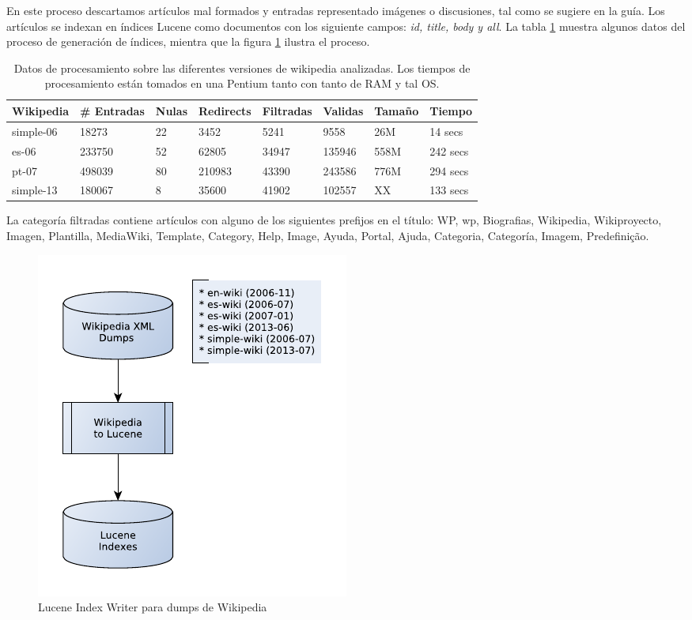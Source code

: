 En este proceso descartamos artículos mal formados y entradas representado imágenes o discusiones, tal como se sugiere en la guía. 
Los artículos se indexan en índices Lucene como documentos con los siguiente campos: \emph{id, title, body y all}. 
La tabla \ref{table:creacion-indices} muestra algunos datos del proceso de generación de índices, mientra que la figura \ref{fig:LuceneIndexWriterWiki} ilustra el proceso.

\begin{table}
\begin{center}
\begin{tabular}{| l | l | l | l | l | l| l|l|}
\hline
Wikipedia & \# Entradas & Nulas & Redirects & Filtradas & Validas & Tamaño & Tiempo \\ \hline
simple-06 & 18273 & 22 &  3452 & 5241 & 9558 & 26M & 14 secs \\ \hline 
es-06 & 233750 & 52 & 62805 & 34947 & 135946 & 558M & 242 secs\\ \hline 
pt-07 & 498039 & 80 & 210983 & 43390 & 243586 & 776M & 294 secs\\ \hline 
simple-13 & 180067 & 8 & 35600 & 41902 & 102557 & XX & 133 secs\\ \hline 
\end{tabular}
\caption{Datos de procesamiento sobre las diferentes versiones de wikipedia analizadas. Los tiempos de procesamiento están tomados en una Pentium tanto con tanto de RAM y tal OS.}
\label{table:creacion-indices}
\end{center}
\end{table}

La categoría filtradas contiene artículos con alguno de los siguientes prefijos en el título: WP, wp, Biografias, Wikipedia, Wikiproyecto, Imagen, Plantilla, MediaWiki, Template, Category, Help, Image, Ayuda, Portal, Ajuda, Categoria, Categoría, Imagem, Predefinição.

\begin{figure}[H]
  \centering
    \includegraphics{graficos/LuceneIndexWriterWiki}
  \caption{Lucene Index Writer para dumps de Wikipedia}
  \label{fig:LuceneIndexWriterWiki}
\end{figure}


